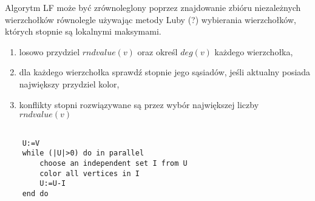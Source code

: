 \documentclass{article}
\begin{document}

	Algorytm LF może być zrównoleglony poprzez 	 znajdowanie zbióru niezależnych wierzchołków równolegle używając metody Luby (?) wybierania wierzchołków, których stopnie są lokalnymi maksymami.
  
	\begin{enumerate}
		\item losowo przydziel $rndvalue(v)$ oraz określ $deg(v)$ każdego wierzchołka,
		\item dla każdego wierzchołka sprawdź stopnie jego sąsiadów, jeśli aktualny posiada największy przydziel kolor,
		\item konflikty stopni rozwiązywane są przez wybór największej liczby $rndvalue(v)$
	\end{enumerate}
	\begin{lstlisting}
	
	U:=V
	while (|U|>0) do in parallel
		choose an independent set I from U
		color all vertices in I
		U:=U-I
	end do
	\end{lstlisting}
 
\end{document}
